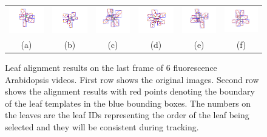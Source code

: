 \begin{figure}
\begin{centering}
\begin{tabular}{c c c c c c}
\includegraphics[trim= 90 60 100 5, clip, width=.11\textwidth]{Figures/AlignPerformance/9_2}&
\includegraphics[trim= 90 60 100 5, clip, width=.11\textwidth]{Figures/AlignPerformance/10_2}&
\includegraphics[trim= 90 60 100 5, clip, width=.11\textwidth]{Figures/AlignPerformance/11_2}&
\includegraphics[trim= 90 60 100 5, clip, width=.11\textwidth]{Figures/AlignPerformance/12_2}&
\includegraphics[trim= 90 60 100 5, clip, width=.11\textwidth]{Figures/AlignPerformance/14_2}&
\includegraphics[trim= 90 60 100 5, clip, width=.11\textwidth]{Figures/AlignPerformance/15_2}\\
(a) & (b) & (c) & (d) & (e) & (f) \\
\end{tabular}
\caption{Leaf alignment results on the last frame of $6$ fluorescence Arabidopsis videos. First row shows the original images. Second row shows the alignment results with red points denoting the boundary of the leaf templates in the blue bounding boxes. The numbers on the leaves are the leaf IDs representing the order of the leaf being selected and they will be consistent during tracking.}
\label{fig:alignResult}
\end{centering}
\end{figure}



